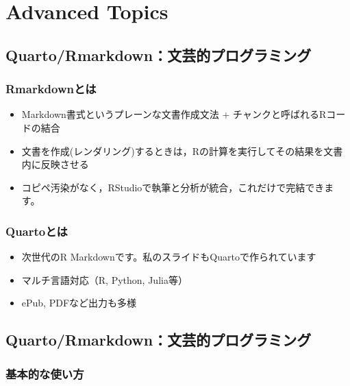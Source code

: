 \documentclass[
  a4paper,
]{ltjsbook}
\providecommand{\tightlist}{%
  \setlength{\itemsep}{0pt}\setlength{\parskip}{0pt}}\usepackage{longtable,booktabs,array}
\begin{document}
\section{Advanced Topics}\label{advanced-topics}

\subsection{Quarto/Rmarkdown：文芸的プログラミング}\label{quartormarkdownux6587ux82b8ux7684ux30d7ux30edux30b0ux30e9ux30dfux30f3ux30b0}

\subsubsection{Rmarkdownとは}\label{rmarkdownux3068ux306f}

\begin{itemize}
\item
  Markdown書式というプレーンな文書作成文法 +
  チャンクと呼ばれるRコードの結合
\item
  文書を作成(レンダリング)するときは，Rの計算を実行してその結果を文書内に反映させる
\item
  コピペ汚染がなく，RStudioで執筆と分析が統合，これだけで完結できます。
\end{itemize}

\subsubsection{Quartoとは}\label{quartoux3068ux306f}

\begin{itemize}
\tightlist
\item
  次世代のR Markdownです。私のスライドもQuartoで作られています
\item
  マルチ言語対応（R, Python, Julia等）
\item
  ePub, PDFなど出力も多様
\end{itemize}

\subsection{Quarto/Rmarkdown：文芸的プログラミング}\label{quartormarkdownux6587ux82b8ux7684ux30d7ux30edux30b0ux30e9ux30dfux30f3ux30b0-1}

\subsubsection{基本的な使い方}\label{ux57faux672cux7684ux306aux4f7fux3044ux65b9-1}
\end{document}
